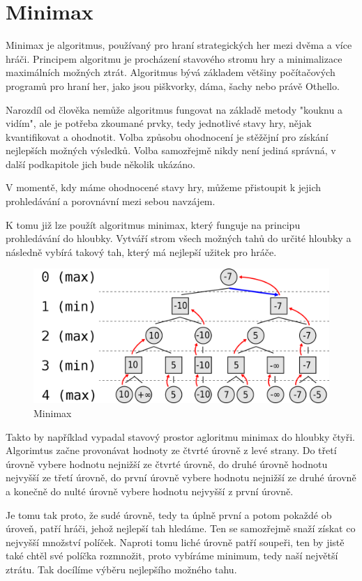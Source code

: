 \documentclass[
12pt,
a4paper,
pdftex,
czech,
titlepage
]{report}
\begin{document}
\section{Minimax}

Minimax je algoritmus, používaný pro hraní strategických her mezi dvěma a více hráči. Principem algoritmu je procházení stavového stromu hry a minimalizace maximálních možných ztrát. Algoritmus bývá základem většiny počítačových programů pro hraní her, jako jsou piškvorky, dáma, šachy nebo právě Othello.

Narozdíl od člověka nemůže algoritmus fungovat na základě metody "kouknu a vidím", ale je potřeba zkoumané prvky, tedy jednotlivé stavy hry, nějak kvantifikovat a ohodnotit. Volba způsobu ohodnocení je stěžějní pro získání nejlepších možných výsledků. Volba samozřejmě nikdy není jediná správná, v další podkapitole jich bude několik ukázáno. 

V momentě, kdy máme ohodnocené stavy hry, můžeme přistoupit k jejich prohledávání a porovnávní mezi sebou navzájem.

K tomu již lze použít algoritmus minimax, který funguje na principu prohledávání do hloubky. Vytváří strom všech možných tahů do určité hloubky a následně vybírá takový tah, který má nejlepší užitek pro hráče.

\begin{figure}[h]
  \centering
  \includegraphics[scale=0.3]{min.png}
  \caption{Minimax}
\end{figure}

Takto by například vypadal stavový prostor agloritmu minimax do hloubky čtyři. Algorimtus začne provonávat hodnoty ze čtvrté úrovně z levé strany. Do třetí úrovně vybere hodnotu nejnižší ze čtvrté úrovně, do druhé úrovně hodnotu nejvyšší ze třetí úrovně, do první úrovně vybere hodnotu nejnižší ze druhé úrovně a konečně do nulté úrovně vybere hodnotu nejvyšší z první úrovně.

Je tomu tak proto, že sudé úrovně, tedy ta úplně první a potom pokaždé ob úroveň, patří hráči, jehož nejlepší tah hledáme. Ten se samozřejmě snaží získat co nejvyšší množství políček. Naproti tomu liché úrovně patří soupeři, ten by jistě také chtěl své políčka rozmnožit, proto vybíráme minimum, tedy naší největší ztrátu. Tak docílíme výběru nejlepšího možného tahu.
\end{document}
